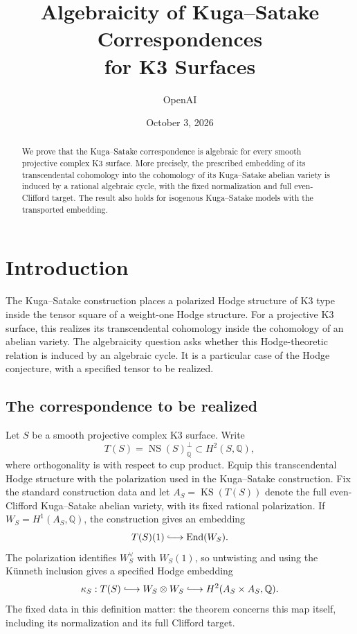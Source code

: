 \documentclass[11pt]{article}
\title{Algebraicity of Kuga--Satake Correspondences\\for K3 Surfaces}
\author{OpenAI}
\date{October 3, 2026}
\numberwithin{equation}{section}
\theoremstyle{definition}
\theoremstyle{remark}
\begin{document}
\begin{abstract}
We prove that the Kuga--Satake correspondence is algebraic for every smooth projective complex K3 surface. More precisely, the prescribed embedding of its transcendental cohomology into the cohomology of its Kuga--Satake abelian variety is induced by a rational algebraic cycle, with the fixed normalization and full even-Clifford target. The result also holds for isogenous Kuga--Satake models with the transported embedding.
\end{abstract}
\tableofcontents

\section{Introduction}
\label{sec:introduction}

The Kuga--Satake construction places a polarized Hodge structure of
K3 type inside the tensor square of a weight-one Hodge structure.
For a projective K3 surface, this realizes its transcendental
cohomology inside the cohomology of an abelian variety.  The
algebraicity question asks whether this Hodge-theoretic relation is
induced by an algebraic cycle.  It is a particular case of the Hodge
conjecture, with a specified tensor to be realized.

\subsection{The correspondence to be realized}

Let $S$ be a smooth projective complex K3 surface.  Write
\[
 T(S)=\operatorname{NS}(S)_\mathbb Q^{\perp}\subset H^2(S,\mathbb Q),
\]
where orthogonality is with respect to cup product.  Equip this
transcendental Hodge structure with the polarization used in the
Kuga--Satake construction.  Fix the standard construction data and
let $A_S=\operatorname{KS}(T(S))$ denote the full even-Clifford Kuga--Satake
abelian variety, with its fixed rational polarization.  If
$W_S=H^1(A_S,\mathbb Q)$, the construction gives an embedding
\[
             T(S)(1)\lhook\joinrel\longrightarrow\operatorname{End}(W_S).
\]
The polarization identifies $W_S^\vee$ with $W_S(1)$, so untwisting
and using the K\"unneth inclusion gives a specified Hodge embedding
\begin{equation}
 \kappa_S:T(S)\lhook\joinrel\longrightarrow
       W_S\otimes W_S\lhook\joinrel\longrightarrow
       H^2(A_S\times A_S,\mathbb Q).
 \label{eq:prescribed-ks-map}
\end{equation}
The fixed data in this definition matter: the theorem concerns this
map itself, including its normalization and its full Clifford target.
\end{document}
